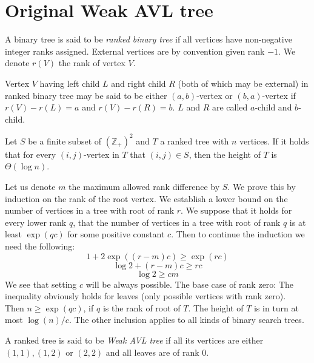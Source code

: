 

\section{Original Weak AVL tree}

\begin{defn}
A binary tree is said to be {\em ranked binary tree} if all vertices have non-negative integer ranks assigned. External vertices are by convention given rank $-1$. We denote $r(V)$ the rank of vertex $V$.
\end{defn}

\begin{defn}
Vertex $V$ having left child $L$ and right child $R$ (both of which may be external) in ranked binary tree may be said to be either $(a,b)$-vertex or $(b,a)$-vertex if $r(V) - r(L) = a$ and $r(V) - r(R) = b$. $L$ and $R$ are called $a$-child and $b$-child.
\end{defn}

\begin{prop}
Let $S$ be a finite subset of ${(\mathbb{Z} _ +)}^2$ and $T$ a ranked tree with $n$ vertices. If it holds that for every $(i,j)$-vertex in $T$ that $(i,j) \in S$, then the height of $T$ is $\Theta(\log n)$.
\label{thm-rbt-depth}
\end{prop}

\begin{myproof}
Let us denote $m$ the maximum allowed rank difference by $S$.
We prove this by induction on the rank of the root vertex. We establish a lower bound on the number of vertices in a tree with root of rank $r$. 
We suppose that it holds for every lower rank $q$, that the number of vertices in a tree with root of rank $q$ is at least $\exp(qc)$ for some positive constant $c$. 
Then to continue the induction we need the following: $$ 1 + 2\exp((r-m)c) \geq \exp(rc) $$ $$ \log 2 + (r-m)c \geq rc $$ $$ \log 2 \geq cm $$
We see that setting $c$ will be always possible.
The base case of rank zero: The inequality obviously holds for leaves (only possible vertices with rank zero).\\
Then $n \geq \exp(qc)$, if $q$ is the rank of root of $T$. The height of $T$ is in turn at most $ \log(n)/c $. 
The other inclusion applies to all kinds of binary search trees.
\end{myproof}

\begin{defn}
A ranked tree is said to be {\em Weak AVL tree} if all its vertices are either $(1,1), (1,2)$ or $(2,2)$ and all leaves are of rank 0.
\end{defn}

